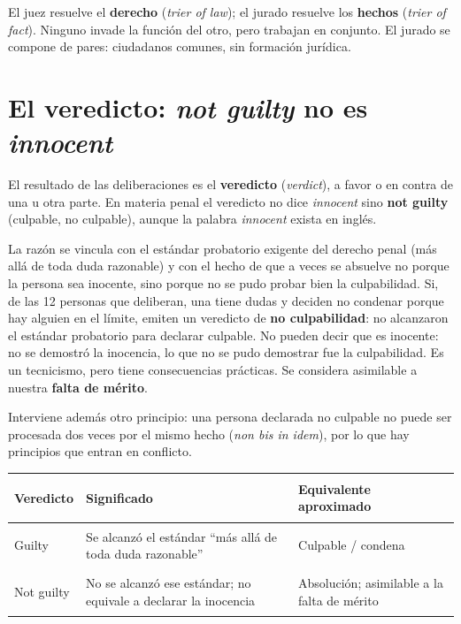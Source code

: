 \documentclass[12pt,oneside]{book}
\begin{document}
\begin{important}
El juez resuelve el \textbf{derecho} (\textit{trier of law}); el jurado resuelve los \textbf{hechos} (\textit{trier of fact}). Ninguno invade la función del otro, pero trabajan en conjunto. El jurado se compone de pares: ciudadanos comunes, sin formación jurídica.
\end{important}

\section{El veredicto: \textit{not guilty} no es \textit{innocent}}

El resultado de las deliberaciones es el \textbf{veredicto} (\textit{verdict}), a favor o en contra de una u otra parte. En materia penal el veredicto no dice \textit{innocent} sino \textbf{not guilty} (culpable, no culpable), aunque la palabra \textit{innocent} exista en inglés.

La razón se vincula con el estándar probatorio exigente del derecho penal (más allá de toda duda razonable) y con el hecho de que a veces se absuelve no porque la persona sea inocente, sino porque no se pudo probar bien la culpabilidad. Si, de las 12 personas que deliberan, una tiene dudas y deciden no condenar porque hay alguien en el límite, emiten un veredicto de \textbf{no culpabilidad}: no alcanzaron el estándar probatorio para declarar culpable. No pueden decir que es inocente: no se demostró la inocencia, lo que no se pudo demostrar fue la culpabilidad. Es un tecnicismo, pero tiene consecuencias prácticas. Se considera asimilable a nuestra \textbf{falta de mérito}.

Interviene además otro principio: una persona declarada no culpable no puede ser procesada dos veces por el mismo hecho (\textit{non bis in idem}), por lo que hay principios que entran en conflicto.

\begin{table}[H]
\centering
\small
\renewcommand{\arraystretch}{1.25}
\begin{tabularx}{\textwidth}{@{}>{\bfseries\raggedright\arraybackslash}p{}YY@{}}
\toprule
Veredicto & Significado & Equivalente aproximado \\
\midrule
Guilty & Se alcanzó el estándar ``más allá de toda duda razonable'' & Culpable / condena \\
Not guilty & No se alcanzó ese estándar; no equivale a declarar la inocencia & Absolución; asimilable a la falta de mérito \\
\bottomrule
\end{tabularx}
\end{table}
\end{document}
